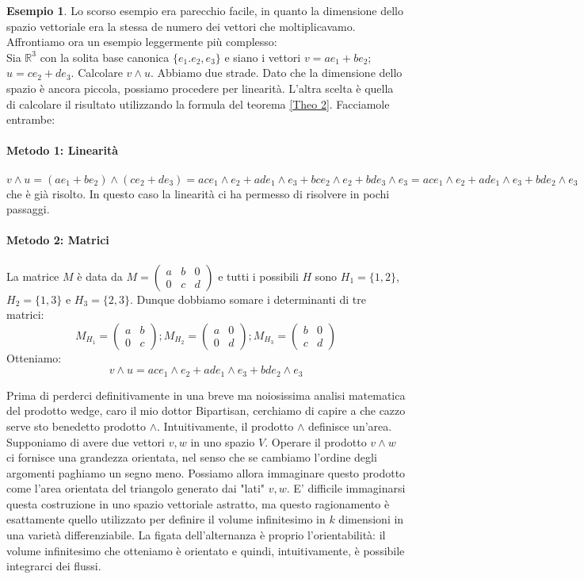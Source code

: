 \documentclass[12pt,a4paper]{report}
\theoremstyle{definition}
\theoremstyle{Theorem}
\theoremstyle{definition}
\newtheorem{Ex}[Def]{Esempio}
\theoremstyle{definition}
\theoremstyle{definition}
\begin{document}
	\begin{Ex}
		Lo scorso esempio era parecchio facile, in quanto la dimensione dello spazio vettoriale era la stessa de numero dei vettori che moltiplicavamo. Affrontiamo ora un esempio leggermente più complesso:\\
		Sia $\mathbb{R}^3$ con la solita base canonica $\{e_1.e_2,e_3\}$ e siano i vettori $v=ae_1+be_2$; $u=ce_2+de_3$. Calcolare $v\wedge u$. Abbiamo due strade. Dato che la dimensione dello spazio è ancora piccola, possiamo procedere per linearità. L'altra scelta è quella di calcolare il risultato utilizzando la formula del teorema \ref{Theo 2}. Facciamole entrambe:\\\\
		\textbf{Metodo 1: Linearità}\\
		\\
		$v\wedge u=(ae_1+be_2)\wedge(ce_2+de_3)=ace_1\wedge e_2+ade_1\wedge e_3+bce_2\wedge e_2+bde_3\wedge e_3=ace_1\wedge e_2+ade_1\wedge e_3+bde_2\wedge e_3$ che è già risolto. In questo caso la linearità ci ha permesso di risolvere in pochi passaggi.\\
		\\
		\textbf{Metodo 2: Matrici}\\
		\\
		La matrice $M$ è data da $M=\begin{pmatrix}
			a&b&0\\0&c&d
		\end{pmatrix}$ e tutti i possibili $H$ sono $H_1=\{1,2\}$,$H_2=\{1,3\}$ e $H_3=\{2,3\}$. Dunque dobbiamo somare i determinanti di tre matrici:\\
		$$M_{H_1}=\begin{pmatrix}
			a&b\\0&c
		\end{pmatrix};
		M_{H_2}=\begin{pmatrix}
			a&0\\0&d
		\end{pmatrix};
		M_{H_3}=\begin{pmatrix}
			b&0\\c&d
		\end{pmatrix}$$ 
		Otteniamo:
		$$v\wedge u=ace_1\wedge e_2+ade_1\wedge e_3+bde_2\wedge e_3$$
	\end{Ex}
	Prima di perderci definitivamente in una breve ma noiosissima analisi matematica del prodotto wedge, caro il mio dottor Bipartisan, cerchiamo di capire a che cazzo serve sto benedetto prodotto $\wedge$. Intuitivamente, il prodotto $\wedge$ definisce un'area. Supponiamo di avere due vettori $v,w$ in uno spazio $V$. Operare il prodotto $v\wedge w$ ci fornisce una grandezza orientata, nel senso che se cambiamo l'ordine degli argomenti paghiamo un segno meno. Possiamo allora immaginare questo prodotto come l'area orientata del triangolo generato dai "lati" $v,w$. E' difficile immaginarsi questa costruzione in uno spazio vettoriale astratto, ma questo ragionamento è esattamente quello utilizzato per definire il volume infinitesimo in $k$ dimensioni in una varietà differenziabile. La figata dell'alternanza è proprio l'orientabilità: il volume infinitesimo che otteniamo è orientato e quindi, intuitivamente, è possibile integrarci dei flussi. 
\end{document}

